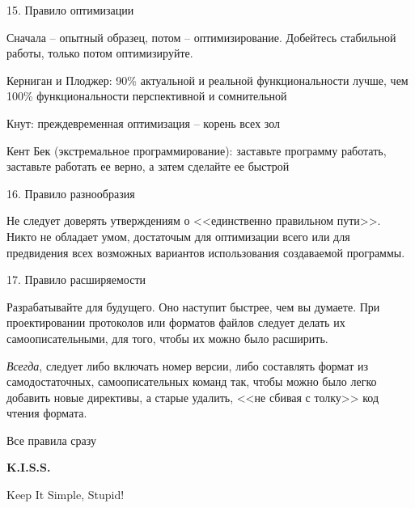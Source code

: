 \begin{frame}{15. Правило оптимизации}
	\begin{block}{Сначала -- опытный образец,  потом -- оптимизирование.}
		Добейтесь стабильной работы,  только потом оптимизируйте.
	\end{block}
	\pause
	\begin{block}{Керниган и Плоджер:}
		90\% актуальной и реальной функциональности лучше,  чем 100\% функциональности перспективной и сомнительной
	\end{block}
	\pause
	\begin{block}{Кнут:}
		преждевременная оптимизация -- корень всех зол
	\end{block}
	\pause
	\begin{block}{Кент Бек (экстремальное программирование):}
		заставьте программу работать,  заставьте работать ее верно,  а затем сделайте ее быстрой
	\end{block}
\end{frame}

\begin{frame}{16. Правило разнообразия}
	\begin{block}{Не следует доверять утверждениям о <<единственно правильном пути>>.}
		\pause
		Никто не обладает умом,  достаточым для оптимизации всего или для предвидения всех возможных вариантов использования создаваемой программы.
	\end{block}
\end{frame}

\begin{frame}{17. Правило расширяемости}
	\begin{block}{Разрабатывайте для будущего. Оно наступит быстрее,  чем вы думаете.}
		\pause
		При проектировании протоколов или форматов файлов следует делать их самоописательными,  для того,  чтобы их можно было расширить.
	\end{block}
	\pause
	{\itshape Всегда},  следует либо включать номер версии,  либо составлять формат из самодостаточных,  
	самоописательных команд так,  чтобы можно было легко добавить новые директивы,  
	а старые удалить, <<не сбивая с толку>> код чтения формата.
\end{frame}

\begin{frame}{Все правила сразу}
	\begin{center}
	{\Huge\bfseries K.I.S.S.}

	\pause
	Keep It Simple,  Stupid!
	\end{center}
\end{frame}


